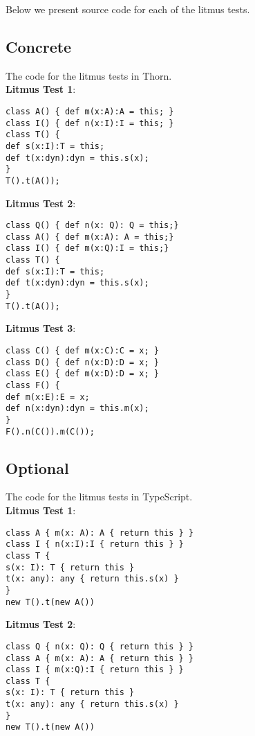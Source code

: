 \documentclass[]{article}
\begin{document}
Below we present source code for each of the litmus tests.

\subsection*{Concrete}

The code for the litmus tests in Thorn. \\ 

\noindent
\textbf{Litmus Test 1}:
\begin{verbatim}
class A() { def m(x:A):A = this; }
class I() { def n(x:I):I = this; }
class T() {
def s(x:I):T = this;
def t(x:dyn):dyn = this.s(x);
}
T().t(A());
\end{verbatim}

\noindent
\textbf{Litmus Test 2}:
\begin{verbatim}
class Q() { def n(x: Q): Q = this;}
class A() { def m(x:A): A = this;}
class I() { def m(x:Q):I = this;}
class T() {
def s(x:I):T = this; 
def t(x:dyn):dyn = this.s(x);
}
T().t(A());   
\end{verbatim}


\noindent\textbf{Litmus Test 3}:
\begin{verbatim}
class C() { def m(x:C):C = x; }
class D() { def n(x:D):D = x; }
class E() { def m(x:D):D = x; }      
class F() {
def m(x:E):E = x;
def n(x:dyn):dyn = this.m(x);
} 
F().n(C()).m(C());
\end{verbatim}

\subsection*{Optional}

The code for the litmus tests in TypeScript. \\

\noindent\textbf{Litmus Test 1}:
\begin{verbatim}
class A { m(x: A): A { return this } }
class I { n(x:I):I { return this } }
class T {
s(x: I): T { return this }
t(x: any): any { return this.s(x) }
}
new T().t(new A())
\end{verbatim}

\noindent\textbf{Litmus Test 2}:
\begin{verbatim}
class Q { n(x: Q): Q { return this } }
class A { m(x: A): A { return this } }
class I { m(x:Q):I { return this } }
class T {
s(x: I): T { return this }
t(x: any): any { return this.s(x) }
}
new T().t(new A())
\end{verbatim}
\end{document}
